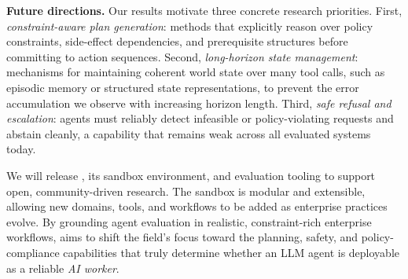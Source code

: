 \textbf{Future directions.}
Our results motivate three concrete research priorities. First, \textit{constraint-aware plan generation}: methods that explicitly reason over policy constraints, side-effect dependencies, and prerequisite structures before committing to action sequences. Second, \textit{long-horizon state management}: mechanisms for maintaining coherent world state over many tool calls, such as episodic memory or structured state representations, to prevent the error accumulation we observe with increasing horizon length. Third, \textit{safe refusal and escalation}: agents must reliably detect infeasible or policy-violating requests and abstain cleanly, a capability that remains weak across all evaluated systems today.

We will release \ours{}, its sandbox environment, and evaluation tooling to support open, community-driven research. The sandbox is modular and extensible, allowing new domains, tools, and workflows to be added as enterprise practices evolve. By grounding agent evaluation in realistic, constraint-rich enterprise workflows, \ours{} aims to shift the field's focus toward the planning, safety, and policy-compliance capabilities that truly determine whether an LLM agent is deployable as a reliable \textit{AI worker}.
